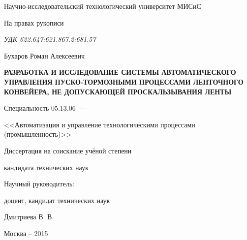 \thispagestyle{empty}

\begin{center}
Научно-исследовательский технологический университет МИСиС
\par
\end{center}

\vspace{20mm}
\begin{flushright}
На правах рукописи

{\sl УДК 622.647:621.867.2:681.57}
\end{flushright}

\vspace{30mm}
\begin{center}
{\large Бухаров Роман Алексеевич}
\end{center}

\vspace{5mm}
\begin{center}
{\bf \large РАЗРАБОТКА И ИССЛЕДОВАНИЕ СИСТЕМЫ АВТОМАТИЧЕСКОГО УПРАВЛЕНИЯ ПУСКО-ТОРМОЗНЫМИ ПРОЦЕССАМИ ЛЕНТОЧНОГО КОНВЕЙЕРА, НЕ ДОПУСКАЮЩЕЙ ПРОСКАЛЬЗЫВАНИЯ ЛЕНТЫ
\par}

\vspace{10mm}
{%
Специальность 05.13.06~---

<<Автоматизация и управление технологическими процессами (промышленность)>>
}

\vspace{10mm}
Диссертация на соискание учёной степени

кандидата технических наук
\end{center}

\vspace{20mm}
\begin{flushright}
Научный руководитель:

доцент, кандидат технических наук

Дмитриева В. В.

\end{flushright}

\vspace{20mm}
\begin{center}
{Москва -- 2015}
\end{center}

\newpage